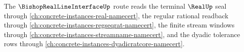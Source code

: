 The $\BishopRealLineInterfaceUp$ route reads the terminal $\RealUp$ seal through \autoref{ch:concrete-instances-real-namecert}, the regular rational readback through \autoref{ch:concrete-instances-regseqrat-namecert}, the finite stream windows through \autoref{ch:concrete-instances-streamname-namecert}, and the dyadic tolerance rows through \autoref{ch:concrete-instances-dyadicratcore-namecert}.







